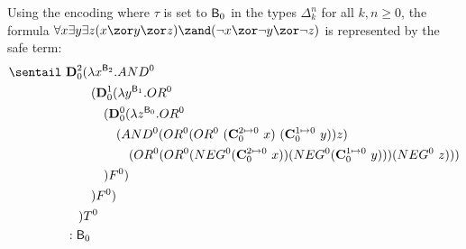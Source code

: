 %
\begin{example}
Using the encoding where $\tau$ is set to  $\mathsf{B}_0$ in the types $\Delta_k^n$ for all $k,n\geq 0$, the formula $\forall x \exists y \exists z (x\zor y\zor z)\zand(\neg x\zor \neg y\zor \neg z)$ is represented by the safe term:
\begin{align*}
\sentail~&\mathbf{D}_0^2(\lambda x^{\booltype_2}. AND^0\\
&\quad\quad (\mathbf{D}_0^1(\lambda y^{\booltype_1}.OR^0\\
&\quad\quad\quad (\mathbf{D}_0^0(\lambda z^{\booltype_0}.OR^0\\
&\quad\quad\quad\quad (AND^0 (OR^0(OR^0~(\mathbf{C}_0^{2\mapsto 0}~x)~(\mathbf{C}_0^{1\mapsto 0}~y))z) \\
&\quad\quad\quad\quad\quad (OR^0(OR^0(NEG^0 (\mathbf{C}_0^{2\mapsto 0}~x))(NEG^0 (\mathbf{C}_0^{1\mapsto 0}~y)))(NEG^0~z))) \\
&\quad\quad\quad )F^0)\\
&\quad\quad)F^0)\\
&\quad) T^0 \\
& : \booltype_0
\end{align*}
\end{example}

